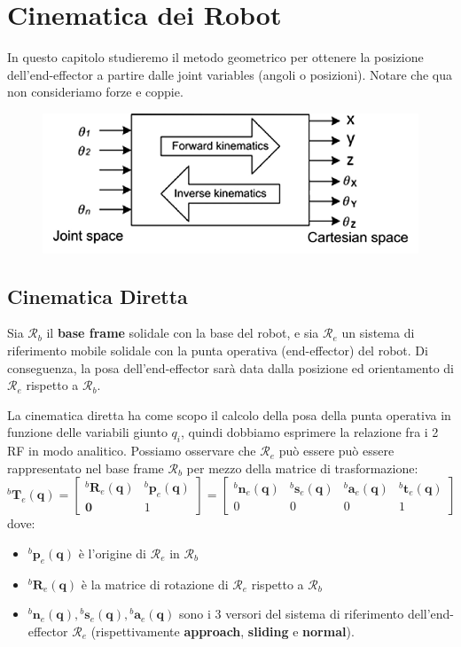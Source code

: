 \chapter{Cinematica dei Robot}

In questo capitolo studieremo il metodo geometrico per ottenere la posizione dell'end-effector a partire dalle joint variables (angoli o posizioni). Notare che qua non consideriamo forze e coppie.
\vspace*{5pt}
\begin{figure}[H]
	\centering
	\includegraphics[width=0.5\linewidth]{images/kinematics_1}
	\label{fig:kinematics1}
\end{figure}


\section{Cinematica Diretta}

Sia $\mathcal{R}_b$ il \textbf{base frame} solidale con la base del robot, e sia $\mathcal{R}_e$ un sistema di riferimento mobile solidale con la punta operativa (end-effector) del robot.
Di conseguenza, la posa dell'end-effector sarà data dalla posizione ed orientamento di $\mathcal{R}_e$ rispetto a $\mathcal{R}_b$.

La cinematica diretta ha come scopo il calcolo della posa della punta operativa in funzione delle variabili giunto $q_i$, quindi dobbiamo esprimere la relazione fra i 2 RF in modo analitico.
Possiamo osservare che $\mathcal{R}_e$ può essere può essere rappresentato nel base frame $\mathcal{R}_b$ per mezzo della matrice di trasformazione:
$$
{}^b\textbf{T}_e(\mathbf{q}) = 
\begin{bmatrix}
	{}^b\mathbf{R}_e(\mathbf{q}) & {}^b\textbf{p}_e(\mathbf{q}) \\
	\mathbf{0} & 1
\end{bmatrix}
=
\begin{bmatrix}
	{}^b\mathbf{n}_e(\mathbf{q}) &
	{}^b\mathbf{s}_e(\mathbf{q}) & 
	{}^b\mathbf{a	}_e(\mathbf{q}) & 
	{}^b\textbf{t}_e(\mathbf{q}) \\
	0 & 0 & 0 & 1
\end{bmatrix}
$$
dove:
\begin{itemize}
	\item ${}^b\textbf{p}_e(\mathbf{q})$ è l'origine di $\mathcal{R}_e$ in $\mathcal{R}_b$
	\item ${}^b\mathbf{R}_e(\mathbf{q})$ è la matrice di rotazione di $\mathcal{R}_e$ rispetto a $\mathcal{R}_b$
	\item $	{}^b\mathbf{n}_e(\mathbf{q}), {}^b\mathbf{s}_e(\mathbf{q}), {}^b\mathbf{a	}_e(\mathbf{q})$ sono i 3 versori del sistema di riferimento dell'end-effector $\mathcal{R}_e$ (rispettivamente \textbf{approach}, \textbf{sliding} e \textbf{normal}).
\end{itemize}

